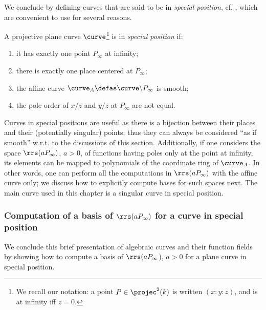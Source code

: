 We conclude by defining curves that are said to be in \emph{special position}, cf. \eg \cite{DBLP:journals/tit/SaintsH95}, which are convenient to use for several reasons.

\begin{defi}
A projective plane curve $\curve$\footnote{We recall our notation: a point $P \in \projec^2(k)$ is written $(x : y : z)$, and is
at infinity iff $z = 0$.} is in \emph{special position} if:
\begin{enumerate}
\item it has exactly one point $P_\infty$ at infinity;
\item there is exactly one place centered at $P_\infty$;
\item the affine curve $\curve_A \defas \curve\backslash P_\infty$ is smooth;
\item the pole order of $x/z$ and $y/z$ at $P_\infty$ are not equal.
\end{enumerate}
\end{defi}

Curves in special positions are useful as there is a bijection between their places and their (potentially singular) points; thus they can always be considered
``as if smooth'' w.r.t. to the discussions of this section. Additionally, if one considers the space $\rrs(aP_\infty)$, $a > 0$, of functions having poles only at the point at infinity,
its elements can be mapped to polynomials of the coordinate ring of $\curve_A$. In other words, one can perform all the computations in $\rrs(aP_\infty)$ with the affine curve
only; we discuss how to explicitly compute bases for such spaces next. The main curve used in this chapter is a singular curve in special position.

\subsubsection{Computation of a basis of $\rrs(aP_\infty)$ for a curve in special position}

We conclude this brief presentation of algebraic curves and their function fields by showing how to compute a basis of $\rrs(aP_\infty$), $a > 0$
for a plane curve in special position.

